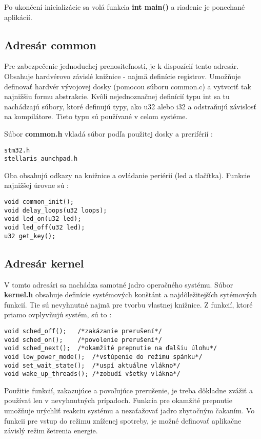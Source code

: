 Po ukončení inicializácie sa volá funkcia \textbf{int main()} a riadenie je ponechané aplikácií.

\subsection{Adresár common}

Pre zabezpečenie jednoduchej prenositeľnosti, je k dispozícií tento adresár. Obsahuje hardvérovo závislé knižnice - najmä definície registrov. Umožňuje definovať hardvér vývojovej dosky (pomocou súboru common.c) a vytvoriť tak najnižšiu formu abstrakcie. Kvôli nejednoznačnej definícií typu int sa tu nachádzajú súbory, ktoré definujú typy, ako u32 alebo i32 a odstraňujú závislosť na kompilátore. Tieto typu sú používané v celom systéme.

Súbor \textbf{common.h} vkladá súbor podľa použitej dosky a preriférií :
{\small
\begin{verbatim}
stm32.h
stellaris_aunchpad.h
\end{verbatim}
}

Oba obsahujú odkazy na knižnice a ovládanie periérií (led a tlačítka).
Funkcie najnižšej úrovne sú :
{\small
\begin{verbatim}
void common_init();
void delay_loops(u32 loops);
void led_on(u32 led);
void led_off(u32 led);
u32 get_key();
\end{verbatim}
}

\subsection{Adresár kernel}

V tomto adresári sa nachádza samotné jadro operačného systému. Súbor \textbf{kernel.h} obsahuje definície systémových konštánt a najdôležitejších sytémových funkcií. Tie sú nevyhnutné najmä pre tvorbu vlastnej knižnice. Z funkcií, ktoré priamo ovplyvňujú systém, sú to :
{\small
\begin{verbatim}
void sched_off();	/*zakázanie prerušení*/
void sched_on();	/*povolenie prerušení*/
void sched_next();	/*okamžité prepnutie na ďalšiu úlohu*/
void low_power_mode();	/*vstúpenie do režimu spánku*/
void set_wait_state();  /*uspí aktuálne vlákno*/
void wake_up_threads(); /*zobudí všetky vlákna*/
\end{verbatim}
}

Použitie funkcií, zakazujúce a povoľujúce prerušenie, je treba dôkladne zvážiť a používať len v nevyhnutných prípadoch. Funkcia pre okamžité prepnutie umožňuje urýchliť reakciu systému a nezaťažovať jadro zbytočným čakaním. Vo funkcii pre vstup do režimu zníženej spotreby, je možné definovať aplikačne závislý režim šetrenia energie.

